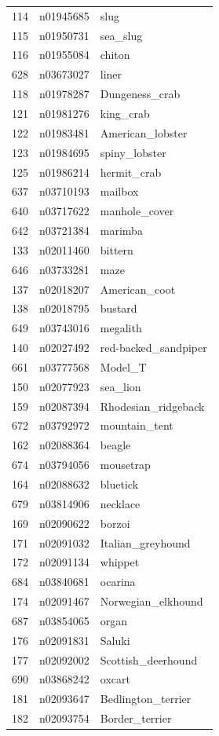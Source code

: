 \begin{table}
\begin{tabular}{cll}
114 & n01945685 & slug \\
115 & n01950731 & sea_slug \\
116 & n01955084 & chiton \\
628 & n03673027 & liner \\
118 & n01978287 & Dungeness_crab \\
121 & n01981276 & king_crab \\
122 & n01983481 & American_lobster \\
123 & n01984695 & spiny_lobster \\
125 & n01986214 & hermit_crab \\
637 & n03710193 & mailbox \\
640 & n03717622 & manhole_cover \\
642 & n03721384 & marimba \\
133 & n02011460 & bittern \\
646 & n03733281 & maze \\
137 & n02018207 & American_coot \\
138 & n02018795 & bustard \\
649 & n03743016 & megalith \\
140 & n02027492 & red-backed_sandpiper \\
661 & n03777568 & Model_T \\
150 & n02077923 & sea_lion \\
159 & n02087394 & Rhodesian_ridgeback \\
672 & n03792972 & mountain_tent \\
162 & n02088364 & beagle \\
674 & n03794056 & mousetrap \\
164 & n02088632 & bluetick \\
679 & n03814906 & necklace \\
169 & n02090622 & borzoi \\
171 & n02091032 & Italian_greyhound \\
172 & n02091134 & whippet \\
684 & n03840681 & ocarina \\
174 & n02091467 & Norwegian_elkhound \\
687 & n03854065 & organ \\
176 & n02091831 & Saluki \\
177 & n02092002 & Scottish_deerhound \\
690 & n03868242 & oxcart \\
181 & n02093647 & Bedlington_terrier \\
182 & n02093754 & Border_terrier \\

\end{tabular}
\end{table}
